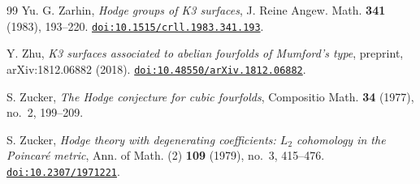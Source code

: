 \begin{thebibliography}{99}
Yu. G. Zarhin,
\emph{Hodge groups of K3 surfaces},
J. Reine Angew. Math. \textbf{341} (1983), 193--220.
\href{https://doi.org/10.1515/crll.1983.341.193}{\texttt{doi:10.1515/crll.1983.341.193}}.

Y. Zhu,
\emph{K3 surfaces associated to abelian fourfolds of Mumford's type},
preprint, arXiv:1812.06882 (2018).
\href{https://doi.org/10.48550/arXiv.1812.06882}{\texttt{doi:10.48550/arXiv.1812.06882}}.

S. Zucker,
\emph{The Hodge conjecture for cubic fourfolds},
Compositio Math. \textbf{34} (1977), no.~2, 199--209.

S. Zucker,
\emph{Hodge theory with degenerating coefficients: $L_{2}$ cohomology in the
Poincar\'e metric},
Ann. of Math. (2) \textbf{109} (1979), no.~3, 415--476.
\href{https://doi.org/10.2307/1971221}{\texttt{doi:10.2307/1971221}}.

\end{thebibliography}
